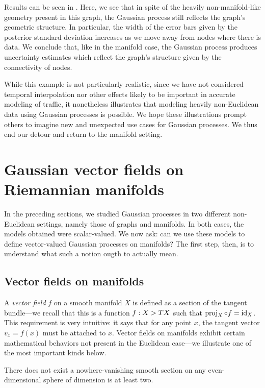 \documentclass[11pt]{book}
\begin{document}
Results can be seen in .
Here, we see that in spite of the heavily non-manifold-like geometry present in this graph, the Gaussian process still reflects the graph's geometric structure.
In particular, the width of the error bars given by the posterior standard deviation increases as we move away from nodes where there is data.
We conclude that, like in the manifold case, the Gaussian process produces uncertainty estimates which reflect the graph's structure given by the connectivity of nodes.

While this example is not particularly realistic, since we have not considered temporal interpolation nor other effects likely to be important in accurate modeling of traffic, it nonetheless illustrates that modeling heavily non-Euclidean data using Gaussian processes is possible.
We hope these illustrations prompt others to imagine new and unexpected use cases for Gaussian processes.
We thus end our detour and return to the manifold setting.

\section{Gaussian vector fields on Riemannian manifolds}

In the preceding sections, we studied Gaussian processes in two different non-Euclidean settings, namely those of graphs and manifolds.
In both cases, the models obtained were scalar-valued.
We now ask: can we use these models to define vector-valued Gaussian processes on manifolds?
The first step, then, is to understand what such a notion ougth to actually mean.

\subsection{Vector fields on manifolds}

A \emph{vector field} $f$ on a smooth manifold $X$ is defined as a section of the tangent bundle---we recall that this is a function $f : X \-> TX$ such that $\operatorname{proj}_X \circ f = \operatorname{id}_X$.
This requirement is very intuitive: it says that for any point $x$, the tangent vector $v_x = f(x)$ must be attached to $x$.
Vector fields on manifolds exhibit certain mathematical behaviors not present in the Euclidean case---we illustrate one of the most important kinds below.

\begin{result}
There does not exist a nowhere-vanishing smooth section on any even-dimensional sphere of dimension is at least two.
\end{result}
\end{document}
